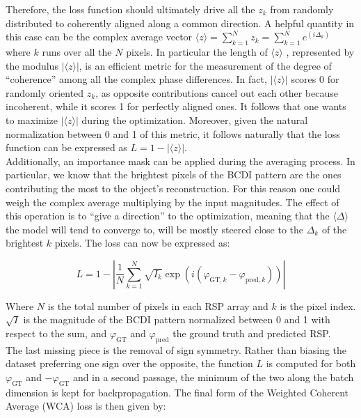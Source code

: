 Therefore, the loss function should ultimately drive all the $z_k$ from randomly distributed to coherently aligned along a common 
direction. A helpful quantity in this case can be the complex average vector $\langle z \rangle = \sum_{k=1}^{N}z_k = \sum_{k=1}^{N}e^{(i\Delta_k)}$
where $k$ runs over all the $N$ pixels. In particular the length of $\langle z \rangle$ , represented by the modulus $|\langle z \rangle|$,
is an efficient metric for the measurement of the degree of ``coherence'' among all the complex phase differences. 
In fact, $|\langle z \rangle|$ scores 0 for randomly oriented $z_k$, as opposite contributions cancel out each other because 
incoherent, while it scores 1 for perfectly aligned ones. It follows that one wants to maximize $|\langle z \rangle|$ during the 
optimization. Moreover, given the natural normalization between 0 and 1 of this metric, it follows naturally that the loss 
function can be expressed as $ L =  1 - |\langle z \rangle| $. \\
Additionally, an importance mask can be applied during the averaging process. In particular, we know that the brightest 
pixels of the BCDI pattern are the ones contributing the most to the object's reconstruction. For this reason one could 
weigh the complex average multiplying by the input magnitudes. The effect of this operation is to ``give a direction'' to the 
optimization, meaning that the $\langle \Delta \rangle $ the model will tend to converge to, will be mostly steered close to 
the $\Delta_k$ of the brightest $k$ pixels. 
The loss can now be expressed as: 

\begin{equation}
    L = 1 - \left|\frac{1}{N}\sum_{k=1}^{N} \sqrt{I_{k}}\exp\left(i(\varphi_{\text{GT},k} - \varphi_{\text{pred},k})\right)\right|
\label{eq:WCA_1}
\end{equation}

Where $N$ is the total number of pixels in each RSP array and $k$ is the pixel index. $\sqrt{I}$ is the magnitude of the BCDI pattern 
normalized between 0 and 1 with respect to the sum, and $\varphi_{\text{GT}}$ and $ \varphi_{\text{pred}}$ the ground truth and 
predicted RSP. \\
The last missing piece is the removal of sign symmetry. Rather than biasing the dataset preferring one sign over the opposite, 
the function $L$ is computed for both $\varphi_{\text{GT}}$ and $-\varphi_{\text{GT}}$ and in a second passage, the minimum of the two 
along the batch dimension is kept for backpropagation. The final form of the Weighted Coherent Average (WCA) loss is then given 
by: 

